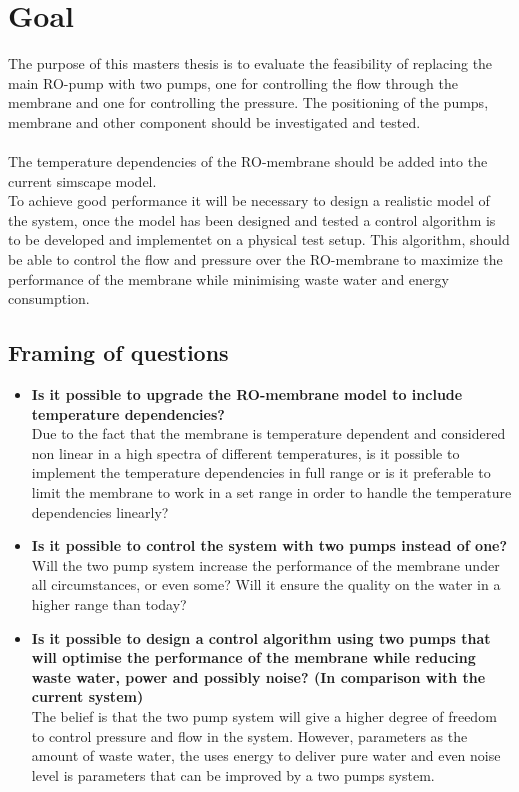 \section{Goal}
The purpose of this masters thesis is to evaluate the feasibility of replacing the main RO-pump with two pumps, one for controlling the flow through the membrane and one for controlling the pressure. The positioning of the pumps, membrane and other component should be investigated and tested. \\
\\
The temperature dependencies of the RO-membrane should be added into the current simscape model.
\\
To achieve good performance it will be necessary to design a realistic model of the system, once the model has been designed and tested a control algorithm is to be developed and implementet on a physical test setup. This algorithm, should be able to control the flow and pressure over the RO-membrane to maximize the performance of the membrane while minimising waste water and energy consumption. \\


\subsection{Framing of questions}
\label{framing}
\begin{itemize}
\renewcommand\labelitemi{-}
   \item \textbf{Is it possible to upgrade the RO-membrane model to include temperature dependencies?}\\ Due to the fact that the membrane is temperature dependent and considered non linear in a high spectra of different temperatures, is it possible to implement the temperature dependencies in full range or is it preferable to limit the membrane to work in a set range in order to handle the temperature dependencies linearly?
   \item \textbf{Is it possible to control the system with two pumps instead of one?}\\ Will the two pump system increase the performance of the membrane under all circumstances, or even some? Will it ensure the quality on the water in a higher range than today?   
   \item \textbf{Is it possible to design a control algorithm using two pumps that will optimise the performance of the membrane while reducing waste water, power and possibly noise? (In comparison with the current system)}\\ The belief is that the two pump system will give a higher degree of freedom to control pressure and flow in the system. However, parameters as the amount of waste water, the uses energy to deliver pure water and even noise level is parameters that can be improved by a two pumps system.  
\end{itemize}


